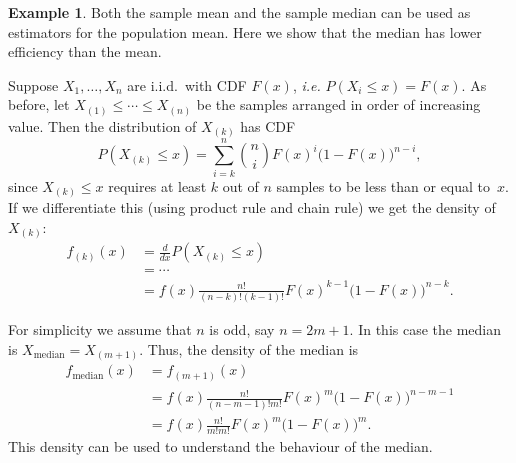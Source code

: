 \documentclass[
  a4paper,
]{article}
\theoremstyle{definition}
\theoremstyle{definition}
\newtheorem{example}{Example}[section]
\theoremstyle{definition}
\theoremstyle{definition}
\theoremstyle{remark}
\begin{document}
\begin{example}
Both the sample mean and the sample median can be used as estimators
for the population mean. Here we show that the median has lower efficiency
than the mean.

Suppose \(X_1,\ldots, X_n\) are i.i.d.~with CDF \(F(x)\), \emph{i.e.}
\(P(X_i \leq x) = F(x)\). As before, let \(X_{(1)} \leq \cdots \leq X_{(n)}\) be the samples arranged in order of increasing value.
Then the distribution of \(X_{(k)}\) has CDF
\begin{equation*}
  P(X_{(k)} \leq x)
  = \sum_{i=k}^n {n\choose i} F(x)^i \bigl(1-F(x)\bigr)^{n-i},
\end{equation*}
since \(X_{(k)} \leq x\) requires at least \(k\) out of \(n\) samples to be
less than or equal to~\(x\).
If we differentiate this (using product rule and chain rule) we get
the density of \(X_{(k)}\):
\begin{align*}
  f_{(k)}(x)
  &= \frac{d}{dx} P(X_{(k)} \leq x) \\
  &= \cdots \\
  &= f(x)\frac{n!}{(n-k)! (k-1)!} F(x)^{k-1}\bigl(1-F(x)\bigr)^{n-k}.
\end{align*}

For simplicity we assume that \(n\) is odd, say \(n = 2m+1\). In this case the
median is \(X_\mathrm{median} = X_{(m+1)}\). Thus, the density of the median is
\begin{align*}
  f_\mathrm{median}(x)
  &= f_{(m+1)}(x) \\
  &= f(x)\frac{n!}{(n-m-1)! m!} F(x)^m\bigl(1-F(x)\bigr)^{n-m-1} \\
  &= f(x)\frac{n!}{m! m!} F(x)^m\bigl(1-F(x)\bigr)^m.
\end{align*}
This density can be used to understand the behaviour of the median.


\end{example}
\end{document}
